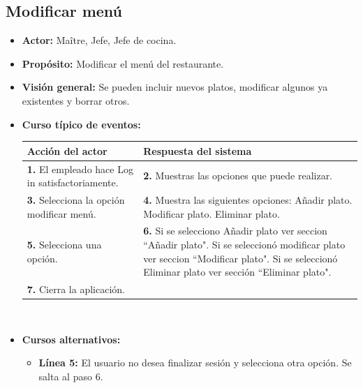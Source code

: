 \documentclass[spanish,a4paper,11pt, twoside]{report}	%
\begin{document}

		\subsection{Modificar menú}
			\begin{itemize}
			\item \textbf{Actor:} Maître, Jefe, Jefe de cocina.
			\item \textbf{Propósito:} Modificar el menú del restaurante.
			\item \textbf{Visión general:} Se pueden incluir nuevos platos, modificar algunos ya existentes y borrar otros.
	\newpage
			\item \textbf{Curso típico de eventos:} 	\\
				\begin{tabular}{|p{6cm}||p{6cm}|}
				\hline
				\textbf{Acción del actor} & \textbf{Respuesta del sistema} \\ \hline \hline
				\textbf{1.}    El empleado hace Log in satisfactoriamente. & \textbf{2.} Muestras las opciones que puede realizar. \\ \hline
				\textbf{3.} Selecciona la opción modificar menú. & \textbf{4.} Muestra las siguientes opciones: Añadir plato. Modificar plato. Eliminar plato. \\ \hline
				\textbf{5.} Selecciona una opción.	& \textbf{6.} Si se selecciono Añadir plato ver seccion “Añadir plato". Si se seleccionó modificar plato ver seccion “Modificar plato". Si se seleccionó Eliminar plato ver sección “Eliminar plato". \\ \hline
				\textbf{7.} Cierra la aplicación. &  \\ \hline
			\end{tabular}
			\\
			\item \textbf{Cursos alternativos:} 
			\begin{itemize}
			\item  \textbf{Línea 5:} El usuario no desea finalizar sesión y selecciona otra opción. Se salta al paso 6.
			\end {itemize}
			

\end{itemize}
\end{document}
